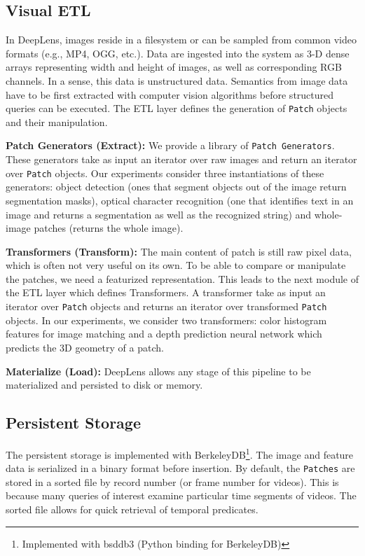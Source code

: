 \subsection{Visual ETL}
\label{subsection:visualETL}
In \textsf{DeepLens},  images reside in a filesystem or can be sampled from common video formats (e.g., MP4, OGG, etc.). Data are ingested into the system as 3-D dense arrays representing width and height of images, as well as  corresponding RGB channels. In a sense, this data is unstructured data. Semantics from image data have to be first extracted with computer vision algorithms before structured queries can be executed. 
The ETL layer defines the generation of \texttt{Patch} objects and their manipulation.

\vspace{0.25em}
\noindent \textbf{Patch Generators (Extract): } We provide a library of \texttt{Patch Generators}. 
These generators take as input an iterator over raw images and return an iterator over \texttt{Patch} objects.  
Our experiments consider three instantiations of these generators: object detection (ones that segment objects out of the image return segmentation masks), optical character recognition (one that identifies text in an image and returns a segmentation as well as the recognized string) and whole-image patches (returns the whole image).


\vspace{0.25em}
\noindent \textbf{Transformers (Transform): } The main content of patch is still raw pixel data, which is often not very useful on its own.
To be able to compare or manipulate the patches, we need a featurized representation.
This leads to the next module of the ETL layer which defines Transformers. 
A transformer take as input an iterator over \texttt{Patch} objects and returns an iterator over transformed \texttt{Patch} objects.  
In our experiments, we consider two transformers: color histogram features for image matching and a depth prediction neural network which predicts the 3D geometry of a patch. 

\vspace{0.25em}
\noindent \textbf{Materialize (Load): } \textsf{DeepLens} allows any stage of this pipeline to be materialized and persisted to disk or memory.

\subsection{Persistent Storage}
The persistent storage is implemented with BerkeleyDB\footnote{Implemented with bsddb3 (Python binding for BerkeleyDB)}. The image and feature data is serialized in a binary format before insertion. By default, the \texttt{Patches} are stored in a sorted file by record number (or frame number for videos). This is because many queries of interest examine particular time segments of videos.
The sorted file allows for quick retrieval of temporal predicates.

